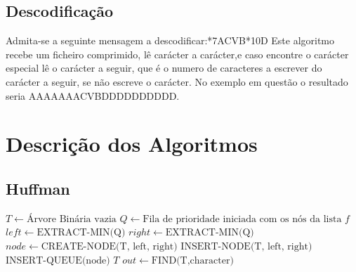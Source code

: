 \documentclass[a4paper,12pt,titlepage]{article}
\begin{document}
\subsection{Descodificação}
Admita-se a seguinte mensagem a descodificar:*7ACVB*10D\newline
Este algoritmo recebe um ficheiro comprimido, lê carácter a carácter,e caso encontre o carácter especial lê o carácter a seguir, que é o numero de caracteres a escrever do carácter a seguir, se não escreve o carácter.\newline
No exemplo em questão o resultado seria AAAAAAACVBDDDDDDDDDD.

\section{Descrição dos Algoritmos}
\subsection{Huffman}
\begin{algorithmic}
\State $T \gets \text{Árvore Binária vazia}$
\State $Q \gets \text{Fila de prioridade iniciada com os nós da lista }f$
\State $left \gets \text{EXTRACT-MIN(Q)}$
\State $right \gets \text{EXTRACT-MIN(Q)}$
\State $node \gets \text{CREATE-NODE(T, left, right)}$
\State $\text{INSERT-NODE(T, left, right)}$
\State $\text{INSERT-QUEUE(node)}$
\EndFor\newline
\Return $T$
\EndProcedure
{}
\State $out \gets \text{FIND(T,character)}$
\EndFor
\EndProcedure
\end{algorithmic}
\newpage
\end{document}
